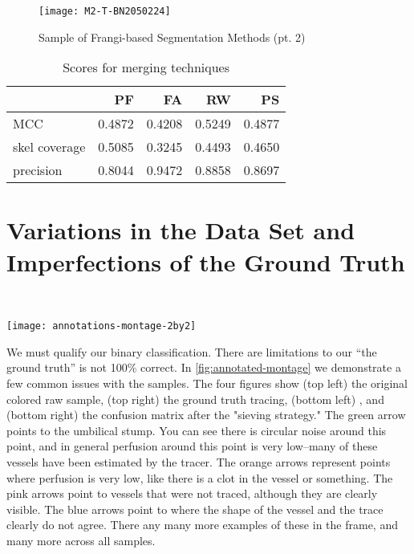 \begin{figure}[p] \centering
	\texttt{[image: M2-T-BN2050224]}
	\caption{Sample of Frangi-based Segmentation Methods (pt. 2)}
\end{figure}

\begin{table}[p]\centering
	\begin{tabular}{l|rrrr}
		{} &        PF &        FA &        RW &        PS \\
		\hline
		MCC           &  0.4872 &  0.4208 &  0.5249 &  0.4877 \\
		skel coverage &  0.5085 &  0.3245 &  0.4493 &  0.4650 \\
		precision     &  0.8044 &  0.9472 &  0.8858 &  0.8697 \\
	\end{tabular}
	\caption{Scores for merging techniques}
\end{table}

\section{Variations in the Data Set and Imperfections of the Ground Truth} \label{sec:NCS-dataset-issues}
\
\begin{sidewaysfigure}
	\texttt{[image: annotations-montage-2by2]}
	\caption{Issues with the ground truth manifesting in Frangi vesselness scores}
	\label{fig:annotated-montage}
\end{sidewaysfigure}

We must qualify our binary classification. There are limitations to our ``the ground truth'' is not 100\% correct. In \cref{fig:annotated-montage} we demonstrate a few common issues with the samples. The four figures show (top left) the original colored raw sample, (top right) the ground truth tracing, (bottom left) \Vmax, and (bottom right) the confusion matrix after the "sieving strategy."  The green arrow points to the umbilical stump. You can see there is circular noise around this point, and in general perfusion around this point is very low--many of these vessels have been estimated by the tracer. The orange arrows represent points where perfusion is very low, like there is a clot in the vessel or something. The pink arrows point to vessels that were not traced, although they are clearly visible. The blue arrows point to where the shape of the vessel and the trace clearly do not agree. There any many more examples of these in the frame, and many more across all samples.

